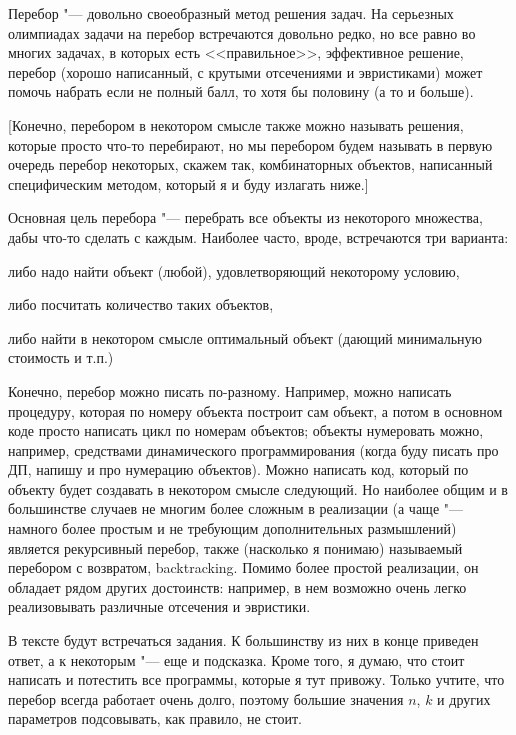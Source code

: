 
Перебор "--- довольно своеобразный метод решения задач. На серьезных олимпиадах 
задачи на перебор встречаются довольно редко, но все равно во многих задачах, в 
которых есть <<правильное>>, эффективное решение, перебор (хорошо написанный, с 
крутыми отсечениями и эвристиками) может помочь набрать если не полный балл, то 
хотя бы половину (а то и больше).

[Конечно, перебором в некотором смысле также можно называть решения, которые 
просто что-то перебирают, но мы перебором будем называть в первую очередь перебор 
некоторых, скажем так, комбинаторных объектов, написанный специфическим методом, который я и буду
излагать ниже.]

Основная цель перебора "--- перебрать все объекты из некоторого множества, дабы 
что-то сделать с каждым. Наиболее 
часто, вроде, встречаются три варианта:
\begin{ulist}
\item либо надо найти объект (любой), удовлетворяющий некоторому условию,
\item либо посчитать количество таких объектов,
\item либо найти в некотором смысле оптимальный объект (дающий минимальную 
   стоимость и т.п.)
\end{ulist}

Конечно, перебор можно писать по-разному. Например, можно написать процедуру, которая по номеру объекта построит сам объект, а потом в основном коде просто написать цикл по номерам объектов; объекты нумеровать можно, например, средствами динамического программирования (когда буду писать про ДП, напишу и про нумерацию объектов). Можно написать код, который по 
объекту будет создавать в некотором смысле следующий. Но наиболее
общим и в большинстве случаев не многим более сложным в реализации (а чаще "--- намного более простым и не требующим дополнительных размышлений) является
рекурсивный перебор, также (насколько я понимаю) называемый перебором с
возвратом, backtracking. Помимо более простой реализации, он обладает рядом других достоинств: например, в нем возможно очень легко реализовывать различные отсечения и эвристики.

В тексте будут встречаться задания. К большинству из них в конце приведен ответ, а к некоторым "--- еще и подсказка. Кроме того, я думаю, что стоит написать и потестить все программы, которые я тут привожу. Только учтите, что перебор всегда работает очень долго, поэтому большие значения $n$, $k$ и других параметров подсовывать, как правило, не стоит.







